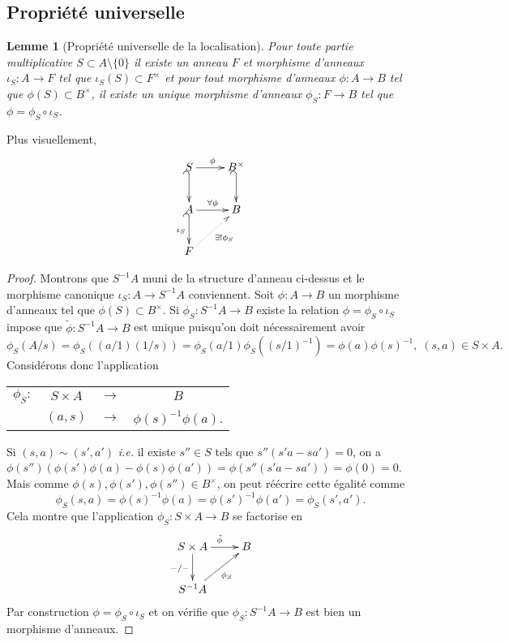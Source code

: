 \documentclass[a4paper, oneside, 12pt]{book}
\theoremstyle{theoremeStyle} %
\newtheorem{lemme}[theoreme]{Lemme}
\theoremstyle{definition} %
\newcommand{\ie}{\textit{i.e.}} %
\begin{document}
 \subsection{Propriété universelle}\label{LocUniv}
	\begin{lemme}[Propriété universelle de la localisation]
		Pour toute partie multiplicative $S\subset A\setminus\lbrace 0\rbrace$  il existe un anneau $F$ et morphisme d'anneaux $\iota_S:A\rightarrow F$ tel que $\iota_S(S)\subset F^\times$ et pour tout  morphisme d'anneaux $\phi:A\rightarrow B$ tel que $\phi(S)\subset B^\times $, il  existe un unique morphisme d'anneaux $ \phi_S:F\rightarrow B$ tel que $\phi=  \phi_S\circ \iota_S$.
	\end{lemme}


  Plus visuellement,
	$$\xymatrix{
		S\ar[r]^\phi\ar@{_{(}->}[d]&B^\times\ar@{_{(}->}[d] \\
		A\ar[r]^{\forall\phi}\ar@{_{(}->}[d]_{\iota_S}&B \\
		F\ar@{.>}[ur]_{\exists ! \phi_S}}
	$$

 \begin{proof} Montrons que  $S^{-1}A$ muni de la structure d'anneau ci-dessus et le morphisme canonique $\iota_S:A\rightarrow S^{-1}A$ conviennent. Soit $\phi:A\rightarrow B$  un morphisme d'anneaux tel que $\phi(S)\subset B^\times$.  Si $\phi_S:S^{-1}A\rightarrow B$ existe la relation $\phi=  \phi_S\circ \iota_S$ impose que  $\tilde{\phi}:S^{-1}A\rightarrow B$ est unique puisqu'on doit nécessairement avoir
 $$\phi_S(A/s)=\phi_S((a/1)(1/s))=\phi_S(a/1)\phi_S((s/1)^{-1})=\phi(a)\phi(s)^{-1},\; (s,a)\in S\times A.$$
 Considérons donc l'application  \begin{tabular}[t]{lclc}
 $\phi_S:$&$ S\times A $&$\rightarrow$&$B$\\
 &$(a,s) $&$\rightarrow$&$ \phi(s)^{-1}\phi(a)$.
 \end{tabular}
 Si $(s,a)\sim (s',a')$  \ie{} il existe $s''\in S$ tels que $s''(s'a-sa')=0$, on a $\phi(s'')(\phi(s')\phi(a)-\phi(s)\phi(a'))=\phi(s''(s'a-sa'))=\phi(0)=0$. Mais comme $\phi(s),\phi(s'),\phi(s'')\in B^{\times}$, on peut réécrire cette égalité comme
 $$\phi_S(s,a)=\phi(s)^{-1}\phi(a)=\phi(s')^{-1}\phi(a')=\phi_S(s',a').$$
 Cela montre que l'application $\phi_S: S\times A  \rightarrow  B$ se factorise  en
 $$\xymatrix{S\times A \ar[r]^{\tilde{\phi}}\ar[d]_{  -/-}& B\\
 S^{-1}A \ar[ur]_{\phi_S}&} $$
Par construction $\phi=  \phi_S\circ \iota_S$ et on vérifie que $\phi_S:S^{-1}A\rightarrow B$ est bien un morphisme d'anneaux.
  \end{proof}
\end{document}
